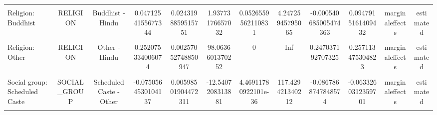 \begin{table}
\begin{tabular}[t]{lccccccccccc}
\cellcolor{gray!10}{Religion: Jain} & \cellcolor{gray!10}{RELIGION} & \cellcolor{gray!10}{Jain - Hindu} & \cellcolor{gray!10}{-0.000581335922756162} & \cellcolor{gray!10}{0.0124357718483921} & \cellcolor{gray!10}{-0.046747072063028} & \cellcolor{gray!10}{0.962714813248988} & \cellcolor{gray!10}{0.0548196056928076} & \cellcolor{gray!10}{-0.0249550008655618} & \cellcolor{gray!10}{0.0237923290200495} & \cellcolor{gray!10}{marginaleffects} & \cellcolor{gray!10}{estimated}\\
Religion: Buddhist & RELIGION & Buddhist - Hindu & 0.0471254155677344 & 0.0243198859515751 & 1.93773176657032 & 0.0526559562110831 & 4.24725945795065 & -0.000540685005474363 & 0.0947915161409432 & marginaleffects & estimated\\
\cellcolor{gray!10}{Religion: Zoroastrian} & \cellcolor{gray!10}{RELIGION} & \cellcolor{gray!10}{Zoroastrian - Hindu} & \cellcolor{gray!10}{0.10134468998358} & \cellcolor{gray!10}{0.034313727175789} & \cellcolor{gray!10}{2.95347367729515} & \cellcolor{gray!10}{0.00314219404966643} & \cellcolor{gray!10}{8.314012006052} & \cellcolor{gray!10}{0.0340910205437003} & \cellcolor{gray!10}{0.16859835942346} & \cellcolor{gray!10}{marginaleffects} & \cellcolor{gray!10}{estimated}\\
Religion: Other & RELIGION & Other - Hindu & 0.252075334006074 & 0.00257052748850947 & 98.0636601370252 & 0 & Inf & 0.247037192707325 & 0.257113475304823 & marginaleffects & estimated\\
\cellcolor{gray!10}{Social group: Scheduled Tribe (ref: Other)} & \cellcolor{gray!10}{SOCIAL\_GROUP} & \cellcolor{gray!10}{Scheduled Tribe - Other} & \cellcolor{gray!10}{-0.102170138872456} & \cellcolor{gray!10}{0.00814070469821662} & \cellcolor{gray!10}{-12.550527584527} & \cellcolor{gray!10}{3.94870286224254e-36} & \cellcolor{gray!10}{117.608032606085} & \cellcolor{gray!10}{-0.118125626889737} & \cellcolor{gray!10}{-0.0862146508551757} & \cellcolor{gray!10}{marginaleffects} & \cellcolor{gray!10}{estimated}\\
Social group: Scheduled Caste & SOCIAL\_GROUP & Scheduled Caste - Other & -0.0750564530104137 & 0.00598501904472311 & -12.5407208313881 & 4.46911780922101e-36 & 117.429421340212 & -0.0867868747848574 & -0.0633260312359701 & marginaleffects & estimated\\
\cellcolor{gray!10}{Social group: Other Backward Class} & \cellcolor{gray!10}{SOCIAL\_GROUP} & \cellcolor{gray!10}{Other Backward Class - Other} & \cellcolor{gray!10}{-0.0289918730615461} & \cellcolor{gray!10}{0.0047509892552105} & \cellcolor{gray!10}{-6.10228133640803} & \cellcolor{gray!10}{1.04565109269841e-09} & \cellcolor{gray!10}{29.8329513129222} & \cellcolor{gray!10}{-0.0383036408926955} & \cellcolor{gray!10}{-0.0196801052303968} & \cellcolor{gray!10}{marginaleffects} & \cellcolor{gray!10}{estimated}\\

\end{tabular}
\end{table}
